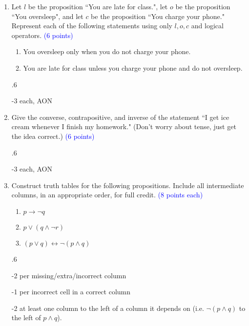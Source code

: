 \documentclass{article}
\newcommand{\pt}[1]{\textcolor{blue}{(#1 points)}}
\newcommand{\pte}[1]{\textcolor{blue}{(#1 points each)}}
\newenvironment{rubric}
{
\par
\begin{spacing}{.6}
\begin{itshape}
\color{red}

}
{
\end{itshape}
\end{spacing}
\par
}
\begin{document}
\begin{enumerate}
    \begin{rubric}
    -3 each, AON
    \end{rubric}
    
    \item Let $l$ be the proposition ``You are late for class.", let $o$ be the proposition ``You oversleep", and let $c$ be the proposition ``You charge your phone." Represent each of the following statements using only $l, o, c$ and logical operators. \pt 6
    
    \begin{enumerate}
        \item You oversleep only when you do not charge your phone.
        \item You are late for class unless you charge your phone and do not oversleep.
    \end{enumerate}
    
    \begin{rubric}
    -3 each, AON
    \end{rubric}
    
    \item Give the converse, contrapositive, and inverse of the statement ``I get ice cream whenever I finish my homework." (Don't worry about tense, just get the idea correct.) \pt 6
    
    \begin{rubric}
    -3 each, AON
    \end{rubric}
    
    \item Construct truth tables for the following propositions. Include all intermediate columns, in an appropriate order, for full credit. \pte 8
    
    \begin{enumerate}
        \item $p \rightarrow \lnot q$
        \item $p \vee (q \wedge \lnot r)$
        
        \item $(p \vee q) \leftrightarrow \lnot (p \wedge q)$
    \end{enumerate}
    
    \begin{rubric}
    -2 per missing/extra/incorrect column
    
    -1 per incorrect cell in a correct column
    
    -2 at least one column to the left of a column it depends on (i.e. $\lnot (p \wedge q)$ to the left of $p \wedge q$).
    

\end{rubric}
\end{enumerate}
\end{document}
